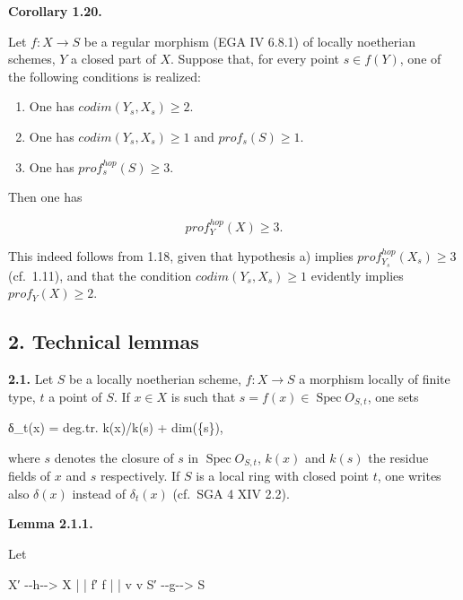 \documentclass[
]{article}
\newenvironment{Shaded}{}{}
\newcommand{\NormalTok}[1]{#1}
\begin{document}
\textbf{Corollary 1.20.}

Let \(f : X \to S\) be a regular morphism (EGA IV 6.8.1) of locally
noetherian schemes, \(Y\) a closed part of \(X\). Suppose that, for
every point \(s \in f(Y)\), one of the following conditions is realized:

\begin{enumerate}
\def\labelenumi{\alph{enumi})}
\item
  One has \(codim(Y_{s}, X_{s}) \geqslant 2\).
\item
  One has \(codim(Y_{s}, X_{s}) \geqslant 1\) and
  \(prof_{s}(S) \geqslant 1\).
\item
  One has \(prof^{hop}_{s}(S) \geqslant 3\).
\end{enumerate}

Then one has

\[
prof^{hop}_{Y}(X) \geqslant 3.
\]

This indeed follows from 1.18, given that hypothesis a) implies
\(prof^{hop}_{Y_{s}}(X_{s}) \geqslant 3\) (cf.~1.11), and that the
condition \(codim(Y_{s}, X_{s}) \geqslant 1\) evidently implies
\(prof_{Y}(X) \geqslant 2\).

\subsection{2. Technical lemmas}\label{technical-lemmas}

\textbf{2.1.} Let \(S\) be a locally noetherian scheme, \(f : X \to S\)
a morphism locally of finite type, \(t\) a point of \(S\). If
\(x \in X\) is such that \(s = f(x) \in \operatorname{Spec} O_{S,t}\),
one sets

\begin{Shaded}
\begin{Highlighting}[]
\NormalTok{δ\_t(x) = deg.tr. k(x)/k(s) + dim(\{s\}),}
\end{Highlighting}
\end{Shaded}

where \({s}\) denotes the closure of \(s\) in
\(\operatorname{Spec} O_{S,t}\), \(k(x)\) and \(k(s)\) the residue
fields of \(x\) and \(s\) respectively. If \(S\) is a local ring with
closed point \(t\), one writes also \(\delta(x)\) instead of
\(\delta_{t}(x)\) (cf.~SGA 4 XIV 2.2).

\textbf{Lemma 2.1.1.}

Let

\begin{Shaded}
\begin{Highlighting}[]
\NormalTok{X′ {-}{-}h{-}{-}\textgreater{} X}
\NormalTok{|         |}
\NormalTok{f′        f}
\NormalTok{|         |}
\NormalTok{v         v}
\NormalTok{S′ {-}{-}g{-}{-}\textgreater{} S}
\end{Highlighting}
\end{Shaded}
\end{document}
